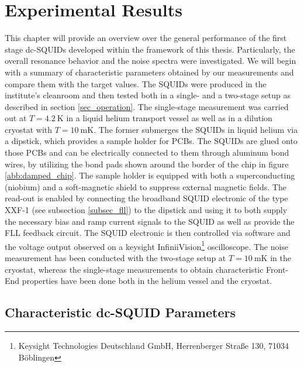 \chapter{Experimental Results} \label{ch_results}

This chapter will provide an overview over the general performance of the first stage dc-SQUIDs developed within the framework of this thesis. Particularly, the overall resonance behavior and the noise spectra were investigated. We will begin with a summary of characteristic parameters obtained by our measurements and compare them with the target values. The SQUIDs were produced in the institute's cleanroom and then tested both in a single- and a two-stage setup as described in section \ref{sec_operation}. The single-stage measurement was carried out at $T=\qty{4.2}{\kelvin}$ in a liquid helium transport vessel as well as in a dilution cryostat with $T=\qty{10}{\milli\kelvin}$. The former submerges the SQUIDs in liquid helium via a dipstick, which provides a sample holder for PCBs. The SQUIDs are glued onto those PCBs and can be electrically connected to them through aluminum bond wires, by utilizing the bond pads shown around the border of the chip in figure \ref{abb:damped_chip}. The sample holder is equipped with both a superconducting (niobium) and a soft-magnetic shield to suppress external magnetic fields. The read-out is enabled by connecting the broadband SQUID electronic of the type XXF-1 (see subsection \ref{subsec_fll}) to the dipstick and using it to both supply the necessary bias and ramp current signals to the SQUID as well as provide the FLL feedback circuit. The SQUID electronic is then controlled via software and the voltage output observed on a keysight InfiniiVision\footnote{Keysight Technologies Deutschland GmbH, Herrenberger Straße 130, 71034 Böblingen} oscilloscope. The noise measurement has been conducted with the two-stage setup at $T=\qty{10}{\milli\kelvin}$ in the cryostat, whereas the single-stage measurements to obtain characteristic Front-End properties have been done both in the helium vessel and the cryostat. 

\section{Characteristic dc-SQUID Parameters}

